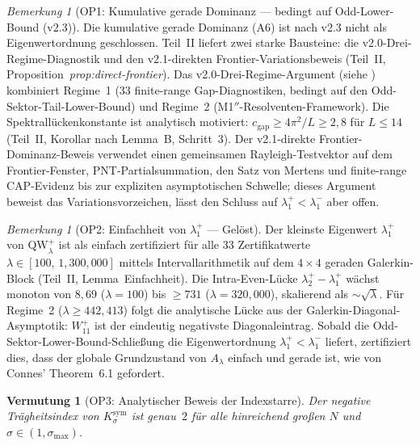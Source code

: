\documentclass[12pt,a4paper]{article}
\newtheorem{conjecture}[theorem]{Vermutung}
\theoremstyle{definition}
\theoremstyle{remark}
\newtheorem{remark}[theorem]{Bemerkung}
\newcommand{\Ksym}{K_\sigma^{\mathrm{sym}}}
\begin{document}
\begin{remark}[OP1: Kumulative gerade Dominanz --- bedingt auf Odd-Lower-Bound (v2.3)]
\label{rem:OP1-resolved}
Die kumulative gerade Dominanz (A6) ist nach v2.3 nicht als Eigenwertordnung geschlossen. Teil~II liefert zwei starke Bausteine: die v2.0-Drei-Regime-Diagnostik und den v2.1-direkten Frontier-Variationsbeweis (Teil~II, Proposition~\emph{prop:direct-frontier}). Das v2.0-Drei-Regime-Argument (siehe ) kombiniert Regime~1 ($33$ finite-range Gap-Diagnostiken, bedingt auf den Odd-Sektor-Tail-Lower-Bound) und Regime~2 (M1$''$-Resolventen-Framework). Die Spektrallückenkonstante ist analytisch motiviert: $c_{\mathrm{gap}} \geq 4\pi^2/L \geq 2{,}8$ für $L \leq 14$ (Teil~II, Korollar nach Lemma~B, Schritt~3). Der v2.1-direkte Frontier-Dominanz-Beweis verwendet einen gemeinsamen Rayleigh-Testvektor auf dem Frontier-Fenster, PNT-Partialsummation, den Satz von Mertens und finite-range CAP-Evidenz bis zur expliziten asymptotischen Schwelle; dieses Argument beweist das Variationsvorzeichen, lässt den Schluss auf $\lambda_1^+<\lambda_1^-$ aber offen.
\end{remark}

\begin{remark}[OP2: Einfachheit von $\lambda_1^+$ --- Gelöst]
\label{rem:OP2-resolved}
Der kleinste Eigenwert $\lambda_1^+$ von $\mathrm{QW}_\lambda^+$ ist als einfach zertifiziert für alle $33$ Zertifikatwerte $\lambda \in [100,\, 1{,}300{,}000]$ mittels Intervallarithmetik auf dem $4 \times 4$ geraden Galerkin-Block (Teil~II, Lemma~Einfachheit). Die Intra-Even-Lücke $\lambda_2^+ - \lambda_1^+$ wächst monoton von $8{,}69$ ($\lambda = 100$) bis $\geq 731$ ($\lambda = 320{,}000$), skalierend als $\sim\!\sqrt{\lambda}$. Für Regime~2 ($\lambda \geq 442{,}413$) folgt die analytische Lücke aus der Galerkin-Diagonal-Asymptotik: $W_{11}^+$ ist der eindeutig negativste Diagonaleintrag. Sobald die Odd-Sektor-Lower-Bound-Schließung die Eigenwertordnung $\lambda_1^+ < \lambda_1^-$ liefert, zertifiziert dies, dass der globale Grundzustand von $A_\lambda$ einfach und gerade ist, wie von Connes' Theorem~6.1 gefordert.
\end{remark}

\begin{conjecture}[OP3: Analytischer Beweis der Indexstarre]
\label{conj:OP3}
Der negative Trägheitsindex von $\Ksym$ ist genau~$2$ für alle hinreichend großen $N$ und $\sigma \in (1, \sigma_{\max})$.
\end{conjecture}
\end{document}
